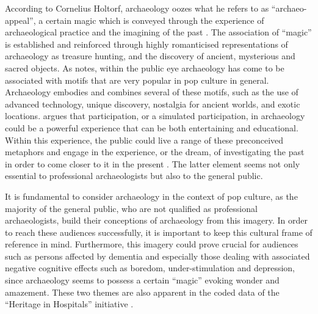 	According to Cornelius Holtorf, archaeology oozes what he refers to as “archaeo-appeal”, a certain magic which  is conveyed through the experience of archaeological practice and the imagining of the past \parencite[156]{Holtorf_2005}. The association of “magic” is established and reinforced through highly romanticised representations of archaeology as treasure hunting, and the discovery of ancient, mysterious and sacred objects. As \textcite[156]{Holtorf_2005} notes, within the public eye archaeology has come to be associated with motifs that are very popular in pop culture in general. Archaeology embodies and combines several of these motifs, such as the use of advanced technology, unique discovery, nostalgia for ancient worlds, and exotic locations. \textcite[157]{Holtorf_2005} argues that participation, or a simulated participation, in archaeology could be a powerful experience that can be both entertaining and educational. Within this experience, the public could live a range of these preconceived metaphors and engage in the experience, or the dream, of investigating the past in order to come closer to it in the present \parencite[156-157]{Holtorf_2005}. The latter element seems not only essential to professional archaeologists but also to the general public.	
	
	It is fundamental to consider archaeology in the context of pop culture, as the majority of the general public, who are not qualified as professional archaeologists, build their conceptions of archaeology from this imagery. In order to reach these audiences successfully, it is important to keep this cultural frame of reference in mind. Furthermore, this imagery could prove crucial for audiences such as persons affected by dementia and especially those dealing with associated negative cognitive effects such as boredom, under-stimulation and depression, since archaeology seems to possess a certain “magic” evoking wonder and amazement. These two themes are also apparent in the coded data of the “Heritage in Hospitals” initiative \parencite[235]{AnderE_2013}.						 
	
	
